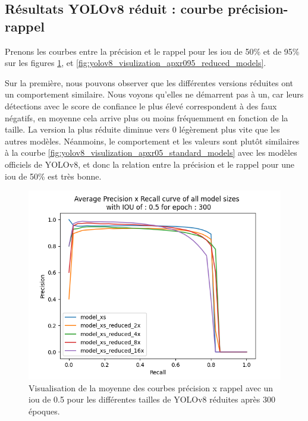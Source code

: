 \clearpage


\subsection{Résultats YOLOv8 réduit : courbe précision-rappel}

Prenons les courbes entre la précision et le rappel pour les \acrshort{iou} de 50\% et de 95\% sur les figures \ref{fig:yolov8_visulization_apxr05_reduced_models}, et \ref{fig:yolov8_visulization_apxr095_reduced_models}.

Sur la première, nous pouvons observer que les différentes versions réduites ont un comportement similaire. Nous voyons qu'elles ne démarrent pas à un, car leurs détections avec le score de confiance le plus élevé correspondent à des faux négatifs, en moyenne cela arrive plus ou moins fréquemment en fonction de la taille. La version la plus réduite diminue vers 0 légèrement plus vite que les autres modèles. Néanmoins, le comportement et les valeurs sont plutôt similaires à la courbe \ref{fig:yolov8_visulization_apxr05_standard_models} avec les modèles officiels de YOLOv8, et donc la relation entre la précision et le rappel pour une \acrshort{iou} de 50\% est très bonne.

\begin{figure}[hbt!]
    \centering
    \includegraphics[scale=0.7]{Figures/results/yolov8/apxr_05_300_reduced_models.png}
    \caption{Visualisation de la moyenne des courbes précision x rappel avec un \acrshort{iou} de 0.5 pour les différentes tailles de YOLOv8 réduites après 300 époques.}
    \label{fig:yolov8_visulization_apxr05_reduced_models}
\end{figure}

